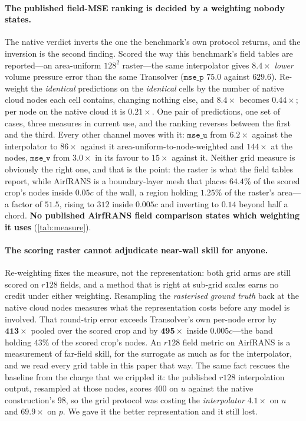 \paragraph{The published field-MSE ranking is decided by a weighting nobody states.} The
native verdict inverts the one the benchmark's own protocol returns, and the inversion is the
second finding. Scored the way this benchmark's field tables are reported---an
area-uniform $128^2$ raster---the same interpolator gives $8.4\times$ \emph{lower} volume
pressure error than the same Transolver ($\texttt{mse\_p}$ $75.0$ against $629.6$).
Re-weight the \emph{identical} predictions on the \emph{identical} cells by the number of
native cloud nodes each cell contains, changing nothing else, and $8.4\times$ becomes
$\mathbf{0.44\times}$; per node on the native cloud it is $0.21\times$. One pair of
predictions, one set of cases, three measures in current use, and the ranking reverses between
the first and the third. Every other channel moves with it: $\texttt{mse\_u}$ from
$6.2\times$ against the interpolator to $86\times$ against it area-uniform-to-node-weighted
and $144\times$ at the nodes, $\texttt{mse\_v}$ from $3.0\times$ in its favour to
$15\times$ against it. Neither grid measure is obviously
the right one, and that is the point: the raster is what the field tables report, while
AirfRANS is a boundary-layer mesh that places $64.4\%$ of the scored crop's nodes inside $0.05c$
of the wall, a region holding $1.25\%$ of the raster's area---a factor of $51.5$, rising to
$312$ inside $0.005c$ and inverting to $0.14$ beyond half a chord. \textbf{No published
AirfRANS field comparison states which weighting it uses} (\autoref{tab:measure}).

\paragraph{The scoring raster cannot adjudicate near-wall skill for anyone.}
Re-weighting fixes the measure, not the representation: both grid arms are still
scored on $r128$ fields, and a method that is right at sub-grid scales earns no credit
under either weighting. Resampling the \emph{rasterised ground truth} back at the native
cloud nodes measures what the representation costs before any model is involved. That
round-trip error exceeds Transolver's own per-node error by $\mathbf{413\times}$ pooled
over the scored crop and by $\mathbf{495\times}$ inside $0.005c$---the band holding $43\%$
of the scored crop's nodes. An $r128$ field metric on AirfRANS is a measurement of far-field
skill, for the surrogate as much as for the interpolator, and we read every grid table in
this paper that way. The same fact rescues the baseline from the charge that we crippled
it: the published $r128$ interpolation output, resampled at those nodes, scores $400$ on
$u$ against the native construction's $98$, so the grid protocol was costing the
\emph{interpolator} $4.1\times$ on $u$ and $69.9\times$ on $p$. We gave it the better
representation and it still lost.

